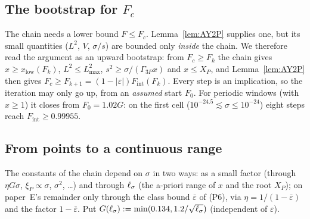 \subsection{The bootstrap for $F_c$}
The chain needs a lower bound $F\le F_c$. Lemma~\ref{lem:AY2P} supplies one, but its small quantities ($L^2$, $V$, $\sigma/s$) are bounded only
\emph{inside} the chain. We therefore read the argument as an upward bootstrap: from $F_c\ge F_k$ the chain gives $x\ge x_{\mathrm{low}}(F_k)$,
$L^2\le L^2_{\max}$, $s^2\ge\sigma/(\Gamma_{3P}x)$ and $x\le X_P$, and Lemma~\ref{lem:AY2P} then gives $F_c\ge F_{k+1}=(1-|\varepsilon|)F_{\mathrm{int}}(F_k)$.
Every step is an implication, so the iteration may only go up, from an \emph{assumed} start $F_0$. For periodic windows (with $x\ge1$) it closes
from $F_0=1.02G$: on the first cell ($10^{-24.5}\lesssim\sigma\le10^{-24}$) eight steps reach $F_{\mathrm{int}}\ge0.99955$.

\subsection{From points to a continuous range}
The constants of the chain depend on $\sigma$ in two ways: as a small factor (through $\eta G\sigma$, $\xi_P\propto\sigma$, $\sigma^2$, \dots) and through
$\ell_\sigma$ (the a-priori range of $x$ and the root $X_P$); on paper~E's remainder only through the class bound $\bar\varepsilon$ of (P6),
via $\eta=1/(1-\bar\varepsilon)$ and the factor $1-\bar\varepsilon$.
Put $G(\ell_\sigma):=\min(0.134,1.2/\sqrt{\ell_\sigma})$ (independent of $\varepsilon$).

